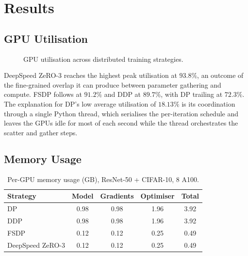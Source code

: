 \section{Results}\label{sec:dist_results}

\subsection{GPU Utilisation}\label{sec:res_util}
\begin{figure}[H]
    \centering
    \caption{GPU utilisation across distributed training strategies.}
    \label{fig:gpu_utilization}
\end{figure}

DeepSpeed ZeRO-3 reaches the highest peak utilisation at $93.8\%$,
an outcome of the fine-grained overlap it can produce between
parameter gathering and compute. FSDP follows at $91.2\%$ and DDP
at $89.7\%$, with DP trailing at $72.3\%$. The explanation for DP's
low average utilisation of $18.13\%$ is its coordination through a
single Python thread, which serialises the per-iteration schedule
and leaves the GPUs idle for most of each second while the thread
orchestrates the scatter and gather steps.

\subsection{Memory Usage}\label{sec:res_mem}
\begin{table}[h]
\centering
\caption{Per-GPU memory usage (GB), ResNet-50 + CIFAR-10, 8 A100.}
\label{tab:memory_usage}
\begin{tabular}{lcccc}
\toprule
\textbf{Strategy}       & \textbf{Model} & \textbf{Gradients} & \textbf{Optimiser} & \textbf{Total} \\
\midrule
DP                      & 0.98  & 0.98  & 1.96  & 3.92 \\
DDP                     & 0.98  & 0.98  & 1.96  & 3.92 \\
FSDP                    & 0.12  & 0.12  & 0.25  & 0.49 \\
DeepSpeed ZeRO-3        & 0.12  & 0.12  & 0.25  & 0.49 \\
\bottomrule
\end{tabular}
\end{table}


